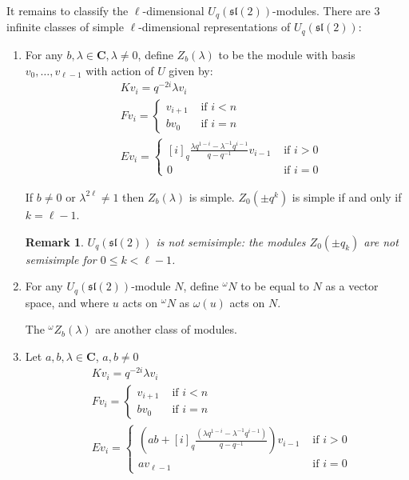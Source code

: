 \documentclass[]{article}
\newtheorem{remark}[theorem]{Remark}
\newcommand{\sll}{\mathfrak{sl}}
\numberwithin{equation}{subsection}
\begin{document}
It remains to classify the $\ell$-dimensional $U_q(\sll(2))$-modules.
There are $3$ infinite classes of simple $\ell$-dimensional representations of  $U_q(\sll(2))$:
\begin{enumerate}
        \item For any $b,\lambda \in \mathbf{C}, \lambda \neq 0$, define
            $Z_b(\lambda)$ to be the module with basis $v_0, \ldots, v_{\ell -
            1}$ with action of $U$ given by: 
\begin{align*}
    &K v_i = q^{-2i} \lambda v_i \\
    &F v_i = \begin{cases} v_{i+1}& \text{ if $i < n$} \\  b v_0& \text{ if $i = n$} \end{cases}  \\
    &E v_i = \begin{cases} 
        [i]_q \frac{\lambda q^{1-i} - \lambda^{-1} q^{i-1}}{q - q^{-1}} v_{i-1}& \text{ if $i > 0$} \\ 
                    0& \text{ if $i = 0$} 
             \end{cases} 
\end{align*}

If $b \neq 0$ or $\lambda^{2\ell}\neq 1$ then $Z_b(\lambda)$ is simple.
$Z_0(\pm q^k)$ is simple if and only if $k = \ell - 1$. 

\begin{remark}
    $U_q(\sll(2))$ is not semisimple: the modules $Z_0(\pm q_k)$ are not semisimple for $0 \leq k < \ell - 1$.
\end{remark}
\item For any $U_q(\sll(2))$-module $N$, define $^\omega N$ to be
    equal to $N$ as a vector space, and where $u$ acts on $^\omega N$ as
    $\omega(u)$ acts on $N$.

    The $^\omega Z_b(\lambda)$ are another class of modules.
\item Let $a,b,\lambda \in \mathbf{C}$, $a,b\neq 0$
\begin{align*}
    &K v_i = q^{-2i} \lambda v_i \\
    &F v_i = \begin{cases} 
                v_{i+1}& \text{ if $i < n$} \\  
                b v_0& \text{ if $i = n$} 
             \end{cases}  \\
    &E v_i = \begin{cases} 
                \left(ab + [i]_q \frac{(\lambda q^{1-i} - \lambda^{-1} q^{i-1})}{q - q^{-1}}\right) v_{i-1}& \text{ if $i > 0$} \\ 
                a v_{\ell - 1}& \text{ if $i = 0$} 
             \end{cases} 
\end{align*}
\end{enumerate}
\end{document}
